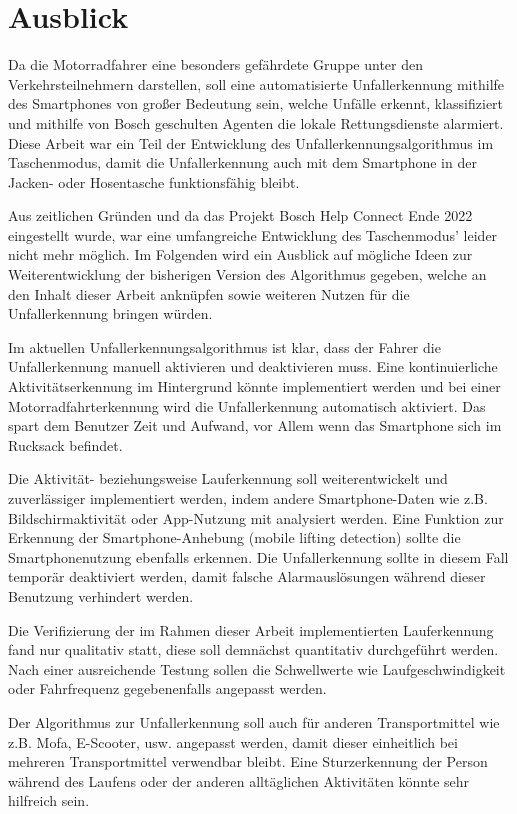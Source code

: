 \chapter{Ausblick}

Da die Motorradfahrer eine besonders gefährdete Gruppe unter den Verkehrsteilnehmern darstellen, soll eine automatisierte Unfallerkennung mithilfe des Smartphones von großer Bedeutung sein, welche Unfälle erkennt, klassifiziert und mithilfe von Bosch geschulten Agenten die lokale Rettungsdienste alarmiert. Diese Arbeit war ein Teil der Entwicklung des Unfallerkennungsalgorithmus im Taschenmodus, damit die Unfallerkennung auch mit dem Smartphone in der Jacken- oder Hosentasche funktionsfähig bleibt.

Aus zeitlichen Gründen und da das Projekt \glqq Bosch Help Connect\grqq{} Ende 2022 eingestellt wurde, war eine umfangreiche Entwicklung des Taschenmodus' leider nicht mehr möglich.
Im Folgenden wird ein Ausblick auf mögliche Ideen zur Weiterentwicklung der bisherigen Version des Algorithmus gegeben, welche an den Inhalt dieser Arbeit anknüpfen sowie weiteren Nutzen für die Unfallerkennung bringen würden.

Im aktuellen Unfallerkennungsalgorithmus ist klar, dass der Fahrer die Unfallerkennung manuell aktivieren und deaktivieren muss. Eine kontinuierliche Aktivit\-äts\-er\-kenn\-ung im Hintergrund könnte implementiert werden und bei einer Motorradfahrterkennung wird die Unfallerkennung automatisch aktiviert. Das spart dem Benutzer Zeit und Aufwand, vor Allem wenn das Smartphone sich im Rucksack befindet. %

Die Aktivität- beziehungsweise Lauferkennung soll weiterentwickelt und zuverlässiger implementiert werden, indem andere Smartphone-Daten wie z.B. Bildschirmaktivität oder App-Nutzung mit analysiert werden.
Eine Funktion zur Erkennung der Smart\-phone-Anhebung (mobile lifting detection) sollte die Smartphonenutzung ebenfalls erkennen. Die Unfallerkennung sollte in diesem Fall temporär deaktiviert werden, damit falsche Alarmauslösungen während dieser Benutzung verhindert werden.

Die Verifizierung der im Rahmen dieser Arbeit implementierten Lauferkennung fand nur qualitativ statt, diese soll demnächst quantitativ durchgeführt werden. Nach einer ausreichende Testung sollen die Schwellwerte wie Laufgeschwindigkeit oder Fahrfrequenz gegebenenfalls angepasst werden.

Der Algorithmus zur Unfallerkennung soll auch für anderen Transportmittel wie z.B. Mofa, E-Scooter, usw. angepasst werden, damit dieser einheitlich bei mehreren Transportmittel verwendbar bleibt. Eine Sturzerkennung der Person während des Laufens oder der anderen alltäglichen Aktivitäten könnte sehr hilfreich sein.

